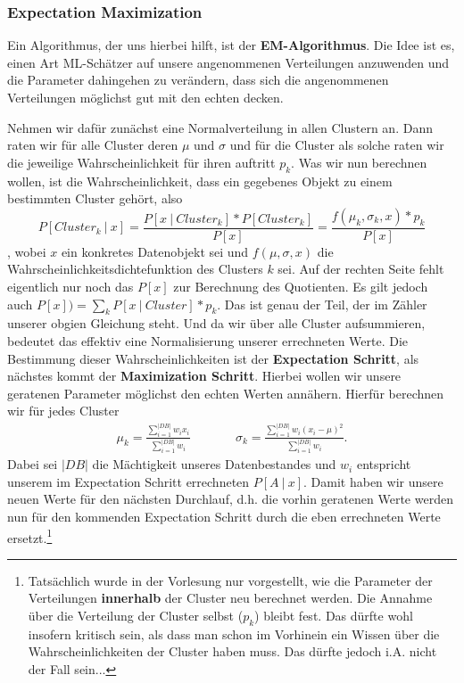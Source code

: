 \subsubsection{Expectation Maximization}
Ein Algorithmus, der uns hierbei hilft, ist der \textbf{EM-Algorithmus}.
Die Idee ist es, einen Art ML-Schätzer auf unsere angenommenen
Verteilungen anzuwenden und die Parameter dahingehen zu verändern,
dass sich die angenommenen Verteilungen möglichst gut mit den echten
decken.

Nehmen wir dafür zunächst eine Normalverteilung in allen Clustern an. Dann
raten wir für alle Cluster deren \(\mu\) und \(\sigma\) und 
für die Cluster als solche raten wir die jeweilige Wahrscheinlichkeit für
ihren auftritt \(p_k\). Was wir nun berechnen
wollen, ist die Wahrscheinlichkeit, dass ein gegebenes Objekt zu einem
bestimmten Cluster gehört, also
\[ P[Cluster_k\ |\ x] = \frac{P[x\ |\ Cluster_k] * P[Cluster_k]}{P[x]}
=\frac{f(\mu_k,\sigma_k,x) * p_k}{P[x]}\],
wobei \(x\) ein konkretes Datenobjekt sei und \(f(\mu,\sigma,x)\) die
Wahrscheinlichkeitsdichtefunktion des Clusters \(k\) sei. Auf der rechten Seite
fehlt eigentlich nur noch das \(P[x]\) zur Berechnung des Quotienten. Es gilt
jedoch auch \(P[x] )= \sum_k P[x\ |\ Cluster]*p_k\). Das ist genau der
Teil, der im Zähler unserer obgien Gleichung steht. Und da wir über alle Cluster
aufsummieren, bedeutet das effektiv eine Normalisierung unserer errechneten
Werte. Die Bestimmung dieser Wahrscheinlichkeiten ist der \textbf{Expectation
Schritt}, als nächstes kommt der \textbf{Maximization Schritt}. Hierbei wollen
wir unsere geratenen Parameter möglichst den echten Werten annähern. Hierfür
berechnen wir für jedes Cluster
\begin{align*}
\mu_k = \frac{\sum_{i=1}^{|DB|}w_i x_i}{\sum_{i=1}^{|DB|} w_i} &\qquad &
\sigma_k = \frac{\sum_{i=1}^{|DB|} w_i(x_i - \mu)^2}{\sum_{i=1}^{|DB|} w_i}.
\end{align*}
Dabei sei \(|DB|\) die Mächtigkeit unseres Datenbestandes und \(w_i\) entspricht
unserem im Expectation Schritt errechneten \(P[A\ |\ x]\). Damit haben wir
unsere neuen Werte für den nächsten Durchlauf, d.h. die vorhin geratenen
Werte werden nun für den kommenden Expectation Schritt durch die eben
errechneten Werte ersetzt.\footnote{Tatsächlich wurde in der Vorlesung
nur vorgestellt, wie die Parameter der Verteilungen \textbf{innerhalb} der Cluster
neu berechnet werden. Die Annahme über die Verteilung der Cluster selbst
(\(p_k\)) bleibt fest. Das dürfte wohl insofern kritisch sein, als dass man
schon im Vorhinein ein Wissen über die Wahrscheinlichkeiten der Cluster haben
muss. Das dürfte jedoch i.A. nicht der Fall sein...}
